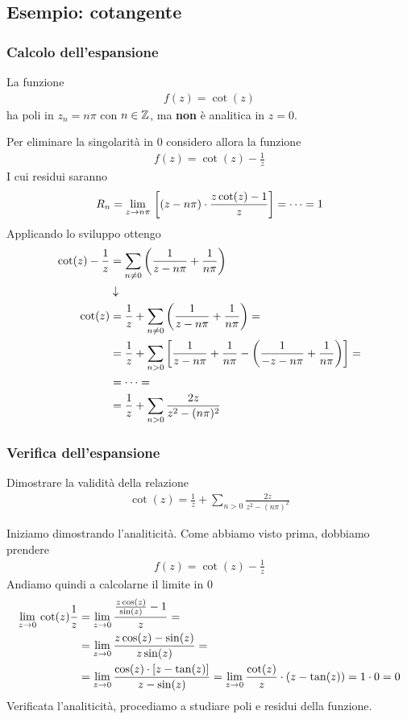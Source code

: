 \subsection{Esempio: cotangente}

\subsubsection{Calcolo dell'espansione}

La funzione  
\begin{align}
	f(z) = \cot(z)
\end{align}
ha poli in $z_n = n\pi$ con $n\in \mathbb{Z}$, ma \textbf{non} è analitica in $z=0$.

Per eliminare la singolarità in 0 considero allora la funzione
\begin{align}
	f(z) = \cot(z) - \frac{1}{z}
\end{align}
I cui residui saranno
\begin{align}
	R_n = \underset{z \rightarrow n\pi}{\lim} \, \left[ (z-n\pi) \cdot \frac{z\cot(z) -1}{z} \right] = \dots = 1  
\end{align}
Applicando lo sviluppo ottengo
\begin{align}
	\cot(z) - \frac{1}{z} &= \sum_{n\neq 0} \left( \frac{1}{z-n\pi} + \frac{1}{n\pi}\right) \\ &\downarrow \nonumber \\
	\cot(z) &= \frac{1}{z} + \sum_{n\neq 0} \left( \frac{1}{z-n\pi} + \frac{1}{n\pi}\right) = \nonumber\\
	&= \frac{1}{z} + \sum_{n>0} \left[ \frac{1}{z-n\pi} + \frac{1}{n\pi} - \left( \frac{1}{-z-n\pi} + \frac{1}{n\pi} \right) \right] = \nonumber\\
	&= \dots  = \nonumber\\
	&= \frac{1}{z} + \sum_{n>0} \frac{2z}{z^2 - (n\pi)^2}
\end{align}

\newpage

\subsubsection{Verifica dell'espansione}

Dimostrare la validità della relazione
\begin{align}
	\cot(z) = \frac{1}{z} + \sum_{n>0} \frac{2z}{z^2 - (n\pi)^2}
\end{align}

Iniziamo dimostrando l'analiticità. Come abbiamo visto prima, dobbiamo prendere
\begin{align}
	f(z) = \cot(z) - \frac{1}{z}
\end{align}
Andiamo quindi a calcolarne il limite in 0
\begin{align}
	\underset{z \rightarrow 0}{\lim} \, \cot(z) \frac{1}{z} &= \underset{z \rightarrow 0}{\lim} \, \frac{\frac{z\cos(z)}{\sin(z)} -1}{z} = \nonumber\\
	&= \underset{z \rightarrow 0}{\lim} \, \frac{z\cos(z) - \sin(z)}{z\sin (z)} = \nonumber\\
	&= \underset{z \rightarrow 0}{\lim} \,\frac{\cos(z) \cdot [z - \tan (z)]}{z - \sin(z)} = \underset{z \rightarrow 0}{\lim} \, \frac{\cot(z)}{z} \cdot(z-\tan(z)) = 1\cdot 0 = 0
\end{align}
Verificata l'analiticità, procediamo a studiare poli e residui della funzione. 

